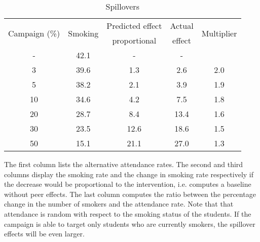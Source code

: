 
    \begin{table}[!h]
    \caption{Spillovers}
    \label{table:ctrf-spillovers}
    \begin{center}
    \begin{tabular}{ccccc}
    \multirow{2}{*}{Campaign (\%)}  & \multirow{2}{*}{Smoking}  & \multicolumn{1}{c}{Predicted effect} & Actual & \multirow{2}{*}{Multiplier} \\
    & & proportional & effect \\
     \hline \hline
    - & 42.1 & - & - & \\ 
   3 & 39.6&  1.3&  2.6&  2.0 \\ 
   5 & 38.2&  2.1&  3.9&  1.9 \\ 
  10 & 34.6&  4.2&  7.5&  1.8 \\ 
  20 & 28.7&  8.4& 13.4&  1.6 \\ 
  30 & 23.5& 12.6& 18.6&  1.5 \\ 
  50 & 15.1& 21.1& 27.0&  1.3 \\ 

    \hline
    \end{tabular}
    \end{center}
     The first column lists the alternative attendance rates. The second and third columns display the smoking rate and the change in smoking rate respectively if the decrease would be proportional to the intervention, i.e. computes a baseline without peer effects. The last column computes the ratio between the percentage change in the number of smokers and the attendance rate. Note that that attendance is random with respect to the smoking status of the students. If the campaign is able to target only students who are currently smokers, the spillover effects will be even larger.
    \end{table}
    